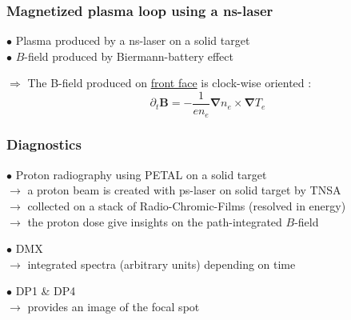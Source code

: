 \documentclass{beamer}
\begin{document}
\begin{frame}
\frametitle{Magnetized plasma loop using a ns-laser}

$\bullet$ Plasma produced by a ns-laser on a solid target \\
$\bullet$ $B$-field produced by Biermann-battery effect

\begin{center}

\end{center}

$\Rightarrow$ The B-field produced on \underline{front face} is clock-wise oriented :
$$
\partial_t \mathbf B = - \frac{1}{en_e} \boldsymbol{\nabla} n_e \times \boldsymbol{\nabla} T_e
$$

\end{frame}



\begin{frame}
\frametitle{Diagnostics}

$\bullet$ Proton radiography using PETAL on a solid target \\
$\to$ a proton beam is created with ps-laser on solid target by TNSA \\
$\to$ collected on a stack of Radio-Chromic-Films (resolved in energy) \\
$\to$ the proton dose give insights on the path-integrated $B$-field \\

\bigskip
\bigskip

$\bullet$ DMX \\
$\to$ integrated spectra (arbitrary units) depending on time \\

\bigskip
\bigskip

$\bullet$ DP1 \& DP4 \\
$\to$ provides an image of the focal spot \\

\end{frame}
\end{document}
